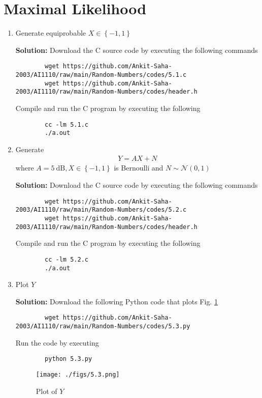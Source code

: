 \documentclass[journal,12pt,twocolumn]{IEEEtran}
\newcommand{\solution}{\noindent \textbf{Solution: }}
\providecommand{\cbrak}[1]{\ensuremath{\left\{#1\right\}}}
\numberwithin{equation}{section}
\renewcommand\thesection{\arabic{section}}
\begin{document}
	\section{Maximal Likelihood}
	\begin{enumerate}[label=\thesection.\arabic*,ref=\thesection.\theenumi]
	\item Generate equiprobable 	$X \in \cbrak{-1, 1}$
	
	\solution Download the C source code by executing the following commands
	\begin{lstlisting}
		wget https://github.com/Ankit-Saha-2003/AI1110/raw/main/Random-Numbers/codes/5.1.c
		wget https://github.com/Ankit-Saha-2003/AI1110/raw/main/Random-Numbers/codes/header.h
	\end{lstlisting}
	Compile and run the C program by executing the following
	\begin{lstlisting}
		cc -lm 5.1.c
		./a.out
	\end{lstlisting}
	
	\item Generate 
	\begin{align}
		Y = AX+N
	\end{align}
	where $A = 5 ~\mathrm{dB}, X \in \cbrak{-1, 1}$ is Bernoulli and $N \sim \mathcal{N}(0,1)$
	
	\solution Download the C source code by executing the following commands
	\begin{lstlisting}
		wget https://github.com/Ankit-Saha-2003/AI1110/raw/main/Random-Numbers/codes/5.2.c
		wget https://github.com/Ankit-Saha-2003/AI1110/raw/main/Random-Numbers/codes/header.h
	\end{lstlisting}
	Compile and run the C program by executing the following
	\begin{lstlisting}
		cc -lm 5.2.c
		./a.out
	\end{lstlisting}
	
	\item Plot $Y$
	
	\solution  Download the following Python code that plots Fig. \ref{fig-5.3}
	\begin{lstlisting}
		wget https://github.com/Ankit-Saha-2003/AI1110/raw/main/Random-Numbers/codes/5.3.py
	\end{lstlisting}
	Run the code by executing
	\begin{lstlisting}
		python 5.3.py
	\end{lstlisting}
	\begin{figure}
		\centering
		\texttt{[image: ./figs/5.3.png]}
		\caption{Plot of $Y$}
		\label{fig-5.3}
	\end{figure}
	

\end{enumerate}
\end{document}
